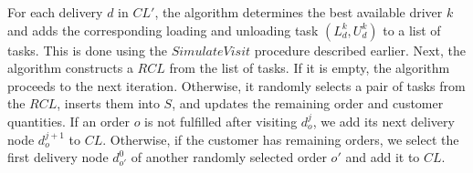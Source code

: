 For each delivery $d$ in $CL'$, the algorithm determines the best available driver $k$ and adds the corresponding loading and unloading task $(L^k_d, U^k_d)$ to a list of tasks. This is done using the $SimulateVisit$ procedure described earlier. Next, the algorithm constructs a $RCL$ from the list of tasks. If it is empty, the algorithm proceeds to the next iteration. Otherwise, it randomly selects a pair of tasks from the $RCL$, inserts them into $S$, and updates the remaining order and customer quantities. If an order $o$ is not fulfilled after visiting $d^j_{o}$, we add its next delivery node $d^{j+1}_{o}$ to $CL$.  Otherwise, if the customer has remaining orders, we select the first delivery node $d^{0}_{o'}$ of another randomly selected order $o'$ and add it to $CL$.



